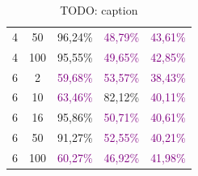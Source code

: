 \begin{table}[ht]
\begin{tabular}{cc|c|c|c}
        {4}                           & {50}      & {96,24\%}                           & \textcolor{purple}{48,79\%}         & \textcolor{purple}{43,61\%}              \\
        {4}                           & {100}     & {95,55\%}                           & \textcolor{purple}{49,65\%}         & \textcolor{purple}{42,85\%}              \\
        {6}                           & {2}       & \textcolor{purple}{59,68\%}         & \textcolor{purple}{53,57\%}         & \textcolor{purple}{38,43\%}              \\
        {6}                           & {10}      & \textcolor{purple}{63,46\%}         & {82,12\%}                           & \textcolor{purple}{40,11\%}              \\
        {6}                           & {16}      & {95,86\%}                           & \textcolor{purple}{50,71\%}         & \textcolor{purple}{40,61\%}              \\
        {6}                           & {50}      & {91,27\%}                           & \textcolor{purple}{52,55\%}         & \textcolor{purple}{40,21\%}              \\
        {6}                           & {100}     & \textcolor{purple}{60,27\%}         & \textcolor{purple}{46,92\%}         & \textcolor{purple}{41,98\%}              \\
        \bottomrule
    \end{tabular}
    \caption{TODO: caption}
    \label{TODO: label}
\end{table}

